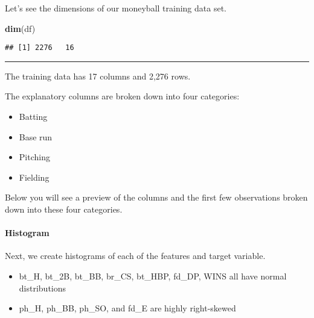 \documentclass[]{article}
\newenvironment{Shaded}{\begin{snugshade}}{\end{snugshade}}
\newcommand{\KeywordTok}[1]{\textcolor[rgb]{0.13,0.29,0.53}{\textbf{#1}}}
\newcommand{\NormalTok}[1]{#1}
\providecommand{\tightlist}{%
  \setlength{\itemsep}{0pt}\setlength{\parskip}{0pt}}
\let\oldparagraph\paragraph
\renewcommand{\paragraph}[1]{\oldparagraph{#1}\mbox{}}
\begin{document}
Let's see the dimensions of our moneyball training data set.

\begin{Shaded}
\begin{Highlighting}[]
\KeywordTok{dim}\NormalTok{(df)}
\end{Highlighting}
\end{Shaded}

\begin{verbatim}
## [1] 2276   16
\end{verbatim}

\begin{center}\rule{0.5\linewidth}{\linethickness}\end{center}

The training data has 17 columns and 2,276 rows.

The explanatory columns are broken down into four categories:

\begin{itemize}
\tightlist
\item
  Batting
\item
  Base run
\item
  Pitching
\item
  Fielding
\end{itemize}

Below you will see a preview of the columns and the first few
observations broken down into these four categories.

\hypertarget{histogram}{%
\paragraph{Histogram}\label{histogram}}

Next, we create histograms of each of the features and target variable.

\begin{itemize}
\tightlist
\item
  bt\_H, bt\_2B, bt\_BB, br\_CS, bt\_HBP, fd\_DP, WINS all have normal
  distributions
\item
  ph\_H, ph\_BB, ph\_SO, and fd\_E are highly right-skewed
\end{itemize}
\end{document}
